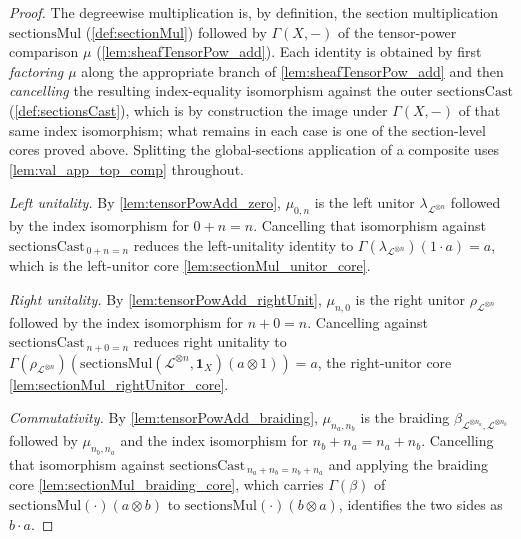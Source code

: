 \begin{proof}
  The degreewise multiplication is, by definition, the section multiplication
  \(\mathrm{sectionsMul}\) (\cref{def:sectionMul}) followed by \(\Gamma(X,-)\) of
  the tensor-power comparison \(\mu\) (\cref{lem:sheafTensorPow_add}). Each
  identity is obtained by first \emph{factoring \(\mu\)} along the appropriate
  branch of \cref{lem:sheafTensorPow_add} and then \emph{cancelling} the resulting
  index-equality isomorphism against the outer \(\mathrm{sectionsCast}\)
  (\cref{def:sectionsCast}), which is by construction the image under
  \(\Gamma(X,-)\) of that same index isomorphism; what remains in each case is one
  of the section-level cores proved above. Splitting the global-sections
  application of a composite uses \cref{lem:val_app_top_comp} throughout.

  \emph{Left unitality.} By \cref{lem:tensorPowAdd_zero}, \(\mu_{0,n}\) is the left
  unitor \(\lambda_{\mathcal{L}^{\otimes n}}\) followed by the index isomorphism
  for \(0+n=n\). Cancelling that isomorphism against
  \(\mathrm{sectionsCast}_{\,0+n=n}\) reduces the left-unitality identity to
  \(\Gamma(\lambda_{\mathcal{L}^{\otimes n}})(1 \cdot a) = a\), which is the
  left-unitor core \cref{lem:sectionMul_unitor_core}.

  \emph{Right unitality.} By \cref{lem:tensorPowAdd_rightUnit}, \(\mu_{n,0}\) is
  the right unitor \(\rho_{\mathcal{L}^{\otimes n}}\) followed by the index
  isomorphism for \(n+0=n\). Cancelling against \(\mathrm{sectionsCast}_{\,n+0=n}\)
  reduces right unitality to
  \(\Gamma(\rho_{\mathcal{L}^{\otimes n}})
  (\mathrm{sectionsMul}(\mathcal{L}^{\otimes n}, \mathbf{1}_X)(a \otimes 1)) = a\),
  the right-unitor core \cref{lem:sectionMul_rightUnitor_core}.

  \emph{Commutativity.} By \cref{lem:tensorPowAdd_braiding}, \(\mu_{n_a,n_b}\) is
  the braiding \(\beta_{\mathcal{L}^{\otimes n_a}, \mathcal{L}^{\otimes n_b}}\)
  followed by \(\mu_{n_b,n_a}\) and the index isomorphism for
  \(n_b+n_a = n_a+n_b\). Cancelling that isomorphism against
  \(\mathrm{sectionsCast}_{\,n_a+n_b = n_b+n_a}\) and applying the braiding core
  \cref{lem:sectionMul_braiding_core}, which carries
  \(\Gamma(\beta)\) of \(\mathrm{sectionsMul}(\cdot)(a \otimes b)\) to
  \(\mathrm{sectionsMul}(\cdot)(b \otimes a)\), identifies the two sides as
  \(b \cdot a\).


\end{proof}
